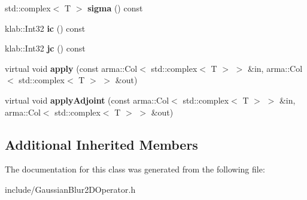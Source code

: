 \begin{DoxyCompactItemize}
\item 
std\+::complex$<$ T $>$ {\bfseries sigma} () const \hypertarget{classkl1p_1_1TGaussianBlur2DOperator_3_01std_1_1complex_3_01T_01_4_01_4_a0e3c87084a5beed67a46b816b08979ce}{}\label{classkl1p_1_1TGaussianBlur2DOperator_3_01std_1_1complex_3_01T_01_4_01_4_a0e3c87084a5beed67a46b816b08979ce}

\item 
klab\+::\+Int32 {\bfseries ic} () const \hypertarget{classkl1p_1_1TGaussianBlur2DOperator_3_01std_1_1complex_3_01T_01_4_01_4_abf1f0c3187ddcff9c42496350113cee9}{}\label{classkl1p_1_1TGaussianBlur2DOperator_3_01std_1_1complex_3_01T_01_4_01_4_abf1f0c3187ddcff9c42496350113cee9}

\item 
klab\+::\+Int32 {\bfseries jc} () const \hypertarget{classkl1p_1_1TGaussianBlur2DOperator_3_01std_1_1complex_3_01T_01_4_01_4_abece5497f63a079327c3ccd63a0a5022}{}\label{classkl1p_1_1TGaussianBlur2DOperator_3_01std_1_1complex_3_01T_01_4_01_4_abece5497f63a079327c3ccd63a0a5022}

\item 
virtual void {\bfseries apply} (const arma\+::\+Col$<$ std\+::complex$<$ T $>$ $>$ \&in, arma\+::\+Col$<$ std\+::complex$<$ T $>$ $>$ \&out)\hypertarget{classkl1p_1_1TGaussianBlur2DOperator_3_01std_1_1complex_3_01T_01_4_01_4_af21db477a1af1c56132a1dc0988fbd75}{}\label{classkl1p_1_1TGaussianBlur2DOperator_3_01std_1_1complex_3_01T_01_4_01_4_af21db477a1af1c56132a1dc0988fbd75}

\item 
virtual void {\bfseries apply\+Adjoint} (const arma\+::\+Col$<$ std\+::complex$<$ T $>$ $>$ \&in, arma\+::\+Col$<$ std\+::complex$<$ T $>$ $>$ \&out)\hypertarget{classkl1p_1_1TGaussianBlur2DOperator_3_01std_1_1complex_3_01T_01_4_01_4_a329700e3a5f6b179b637850fbbb1cc2e}{}\label{classkl1p_1_1TGaussianBlur2DOperator_3_01std_1_1complex_3_01T_01_4_01_4_a329700e3a5f6b179b637850fbbb1cc2e}

\end{DoxyCompactItemize}
\subsection*{Additional Inherited Members}


The documentation for this class was generated from the following file\+:\begin{DoxyCompactItemize}
\item 
include/Gaussian\+Blur2\+D\+Operator.\+h\end{DoxyCompactItemize}
